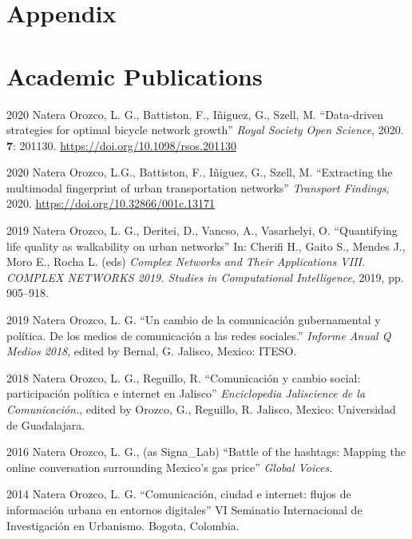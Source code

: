 \documentclass{academiccv}
\begin{document}
\newpage

\section*{Appendix}

\section*{Academic Publications}
\begin{tablist}
	\item[2020] \tab Natera Orozco, L. G., Battiston, F., I\~niguez, G., Szell, M. \enquote{Data-driven strategies for optimal bicycle network growth} \textit{Royal Society Open Science}, 2020. \textbf{7}: 201130. \url{https://doi.org/10.1098/rsos.201130}

	\item[2020] \tab Natera Orozco, L.G., Battiston, F., I\~niguez, G., Szell, M. \enquote{Extracting the multimodal fingerprint of urban transportation networks} \textit{Transport Findings}, 2020. \url{https://doi.org/10.32866/001c.13171}
	\item[2019] \tab Natera Orozco, L. G., Deritei, D., Vancso, A., Vasarhelyi, O. \enquote{Quantifying life quality as walkability on urban networks} In: Cherifi H., Gaito S., Mendes J., Moro E., Rocha L. (eds) \textit{Complex Networks and Their Applications VIII. COMPLEX NETWORKS 2019. Studies in Computational Intelligence}, 2019, pp. 905–918. 
	\item[2019] \tab Natera Orozco, L. G. \enquote{Un cambio de la comunicación gubernamental y política. De los medios de comunicación a las redes sociales.} \textit{Informe Anual Q Medios 2018}, edited by Bernal, G. Jalisco, Mexico: ITESO.
	\item[2018] \tab Natera Orozco, L. G., Reguillo, R. \enquote{Comunicación y cambio social: participación política e internet en Jalisco} \textit{Enciclopedia Jaliscience de la Comunicación.}, edited by Orozco, G., Reguillo, R. Jalisco, Mexico: Universidad de Guadalajara. 
	\item[2016] \tab Natera Orozco, L. G., (as Signa\_Lab) \enquote{Battle of the hashtags: Mapping the online conversation surrounding Mexico's gas price} \textit{Global Voices.} 
	\item[2014] \tab Natera Orozco, L. G. \enquote{Comunicación, ciudad e internet: flujos de información urbana en entornos digitales} VI Seminatio Internacional de Investigación en Urbanismo. Bogota, Colombia. 
\end{tablist}
\end{document}
